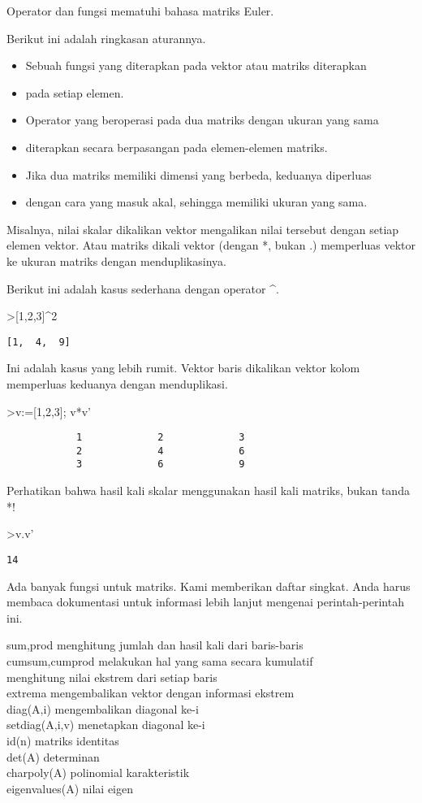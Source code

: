 \documentclass[
]{book}
\begin{document}
Operator dan fungsi mematuhi bahasa matriks Euler.

Berikut ini adalah ringkasan aturannya.

\begin{itemize}
\item
  Sebuah fungsi yang diterapkan pada vektor atau matriks diterapkan
\item
  pada setiap elemen.
\item
  Operator yang beroperasi pada dua matriks dengan ukuran yang sama
\item
  diterapkan secara berpasangan pada elemen-elemen matriks.
\item
  Jika dua matriks memiliki dimensi yang berbeda, keduanya diperluas
\item
  dengan cara yang masuk akal, sehingga memiliki ukuran yang sama.
\end{itemize}

Misalnya, nilai skalar dikalikan vektor mengalikan nilai tersebut dengan setiap elemen vektor. Atau matriks dikali vektor (dengan *, bukan .) memperluas vektor ke ukuran matriks dengan menduplikasinya.

Berikut ini adalah kasus sederhana dengan operator \^{}.

\textgreater{[}1,2,3{]}\^{}2

\begin{verbatim}
[1,  4,  9]
\end{verbatim}

Ini adalah kasus yang lebih rumit. Vektor baris dikalikan vektor kolom memperluas keduanya dengan menduplikasi.

\textgreater v:={[}1,2,3{]}; v*v'

\begin{verbatim}
            1             2             3 
            2             4             6 
            3             6             9 
\end{verbatim}

Perhatikan bahwa hasil kali skalar menggunakan hasil kali matriks, bukan tanda *!

\textgreater v.v'

\begin{verbatim}
14
\end{verbatim}

Ada banyak fungsi untuk matriks. Kami memberikan daftar singkat. Anda harus membaca dokumentasi untuk informasi lebih lanjut mengenai perintah-perintah ini.

sum,prod menghitung jumlah dan hasil kali dari baris-baris\\
cumsum,cumprod melakukan hal yang sama secara kumulatif\\
menghitung nilai ekstrem dari setiap baris\\
extrema mengembalikan vektor dengan informasi ekstrem\\
diag(A,i) mengembalikan diagonal ke-i\\
setdiag(A,i,v) menetapkan diagonal ke-i\\
id(n) matriks identitas\\
det(A) determinan\\
charpoly(A) polinomial karakteristik\\
eigenvalues(A) nilai eigen
\end{document}
